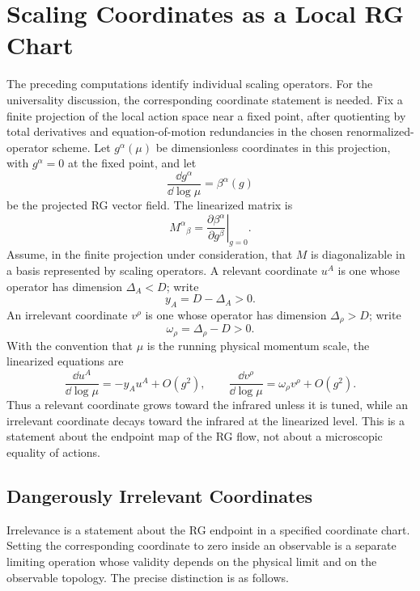 \section{Scaling Coordinates as a Local RG Chart}

The preceding computations identify individual scaling operators.  For the
universality discussion, the corresponding coordinate statement is needed.
Fix a finite projection of the local action space near a fixed point, after
quotienting by total derivatives and equation-of-motion redundancies in the
chosen renormalized-operator scheme.  Let \(g^\alpha(\mu)\) be dimensionless
coordinates in this projection, with \(g^\alpha=0\) at the fixed point, and
let
\[
  \frac{\dd g^\alpha}{\dd\log\mu}
  =
  \beta^\alpha(g)
\]
be the projected RG vector field.  The linearized matrix is
\[
  M^\alpha{}_\beta
  =
  \left.
  \frac{\partial\beta^\alpha}{\partial g^\beta}
  \right|_{g=0}.
\]
Assume, in the finite projection under consideration, that \(M\) is
diagonalizable in a basis represented by scaling operators.  A relevant
coordinate \(u^A\) is one whose operator has dimension
\(\Delta_A<D\); write
\[
  y_A=D-\Delta_A>0 .
\]
An irrelevant coordinate \(v^\rho\) is one whose operator has dimension
\(\Delta_\rho>D\); write
\[
  \omega_\rho=\Delta_\rho-D>0 .
\]
With the convention that \(\mu\) is the running physical momentum scale, the
linearized equations are
\begin{equation}
  \frac{\dd u^A}{\dd\log\mu}
  =
  -y_Au^A+O(g^2),
  \qquad
  \frac{\dd v^\rho}{\dd\log\mu}
  =
  \omega_\rho v^\rho+O(g^2).
  \label{eq:critical-scaling-coordinate-linear-flow}
\end{equation}
Thus a relevant coordinate grows toward the infrared unless it is tuned, while
an irrelevant coordinate decays toward the infrared at the linearized level.
This is a statement about the endpoint map of the RG flow, not about a
microscopic equality of actions.

\subsection{Dangerously Irrelevant Coordinates}
\label{sec:dangerously-irrelevant-coordinates}

Irrelevance is a statement about the RG endpoint in a specified coordinate
chart.  Setting the corresponding coordinate to zero inside an observable is a
separate limiting operation whose validity depends on the physical limit and
on the observable topology.  The precise distinction is as follows.

